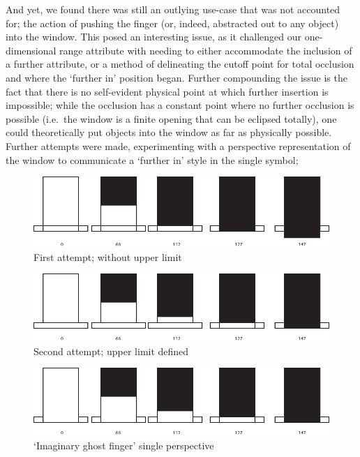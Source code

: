 And yet, we found there was still an outlying use-case that was not accounted for; the action of pushing the finger (or, indeed, abstracted out to any object) into the window. 
This posed an interesting issue, as it challenged our one-dimensional range attribute with needing to either accommodate the inclusion of a further attribute, or a method of delineating the cutoff point for total occlusion and where the `further in' position began. 
Further compounding the issue is the fact that there is no self-evident physical point at which further insertion is impossible; 
while the occlusion has a constant point where no further occlusion is possible (i.e.\ the window is a finite opening that can be eclipsed totally), one could theoretically put objects into the window as far as physically possible.
Further attempts were made, experimenting with a perspective representation of the window to communicate a `further in' style in the single symbol; 

\begin{figure}
\includegraphics[width=\linewidth]{./resources/Asset 4.pdf}
\caption{First attempt; without upper limit}\label{fig:Asset4}
\end{figure}

\begin{figure}
\includegraphics[width=\linewidth]{./resources/Asset 5.pdf}
\caption{Second attempt; upper limit defined}\label{fig:Asset5}
\end{figure}

\begin{figure}
\includegraphics[width=\linewidth]{./resources/Asset 6.pdf}
\caption{`Imaginary ghost finger' single perspective}\label{fig:Asset6}
\end{figure}

